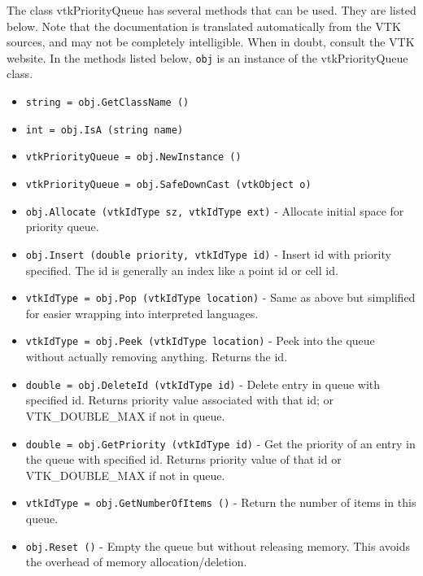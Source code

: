 The class vtkPriorityQueue has several methods that can be used.
  They are listed below.
Note that the documentation is translated automatically from the VTK sources,
and may not be completely intelligible.  When in doubt, consult the VTK website.
In the methods listed below, \verb|obj| is an instance of the vtkPriorityQueue class.
\begin{itemize}
\item  \verb|string = obj.GetClassName ()|

\item  \verb|int = obj.IsA (string name)|

\item  \verb|vtkPriorityQueue = obj.NewInstance ()|

\item  \verb|vtkPriorityQueue = obj.SafeDownCast (vtkObject o)|

\item  \verb|obj.Allocate (vtkIdType sz, vtkIdType ext)| -  Allocate initial space for priority queue.

\item  \verb|obj.Insert (double priority, vtkIdType id)| -  Insert id with priority specified. The id is generally an
 index like a point id or cell id.

\item  \verb|vtkIdType = obj.Pop (vtkIdType location)| -  Same as above but simplified for easier wrapping into interpreted
 languages.

\item  \verb|vtkIdType = obj.Peek (vtkIdType location)| -  Peek into the queue without actually removing anything. Returns the
 id.

\item  \verb|double = obj.DeleteId (vtkIdType id)| -  Delete entry in queue with specified id. Returns priority value
 associated with that id; or VTK\_DOUBLE\_MAX if not in queue.

\item  \verb|double = obj.GetPriority (vtkIdType id)| -  Get the priority of an entry in the queue with specified id. Returns
 priority value of that id or VTK\_DOUBLE\_MAX if not in queue.

\item  \verb|vtkIdType = obj.GetNumberOfItems ()| -  Return the number of items in this queue.

\item  \verb|obj.Reset ()| -  Empty the queue but without releasing memory. This avoids the
 overhead of memory allocation/deletion.

\end{itemize}
